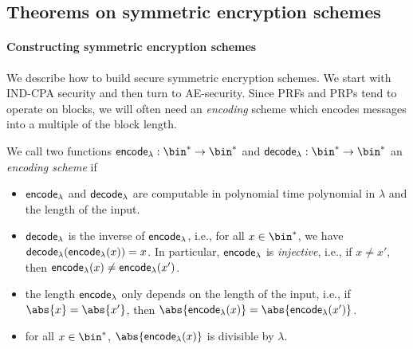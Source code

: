 \subsection{Theorems on symmetric encryption schemes}
\paragraph{Constructing symmetric encryption schemes}
We describe how to build secure symmetric encryption schemes. We start with IND-CPA security
and then turn to AE-security. Since PRFs and PRPs tend to operate on blocks, we will often
need an \emph{encoding} scheme which encodes messages into a multiple of the block length.
\begin{definition}
  We call two functions $\O{encode}_\lambda:\bin^*\rightarrow\bin^*$ and $\O{decode}_\lambda:\bin^*\rightarrow\bin^*$
  an \emph{encoding scheme} if
  \begin{itemize}
    \item $\mathsf{encode}_\lambda$ and $\mathsf{decode}_\lambda$ are computable in polynomial time polynomial in $\lambda$ and the length of the input.
    \item $\mathsf{decode}_\lambda$ is the inverse of $\mathsf{encode}_\lambda$, i.e., for all $x\in\bin^*$, we have
          $\mathsf{decode}_\lambda(\mathsf{encode}_\lambda(x))=x$. In particular, $\mathsf{encode}_\lambda$ is \emph{injective}, i.e., if $x\neq x'$, then $\mathsf{encode}_\lambda(x)\neq\mathsf{encode}_\lambda(x')$.
    \item the length $\mathsf{encode}_\lambda$ only depends on the length of the input, i.e., if $\abs{x}=\abs{x'}$, then
          $\abs{\O{encode}_\lambda(x)}=\abs{\O{encode}_\lambda(x')}$.
    \item for all $x\in\bin^*$, $\abs{\O{encode}_\lambda(x)}$ is divisible by $\lambda$.
  \end{itemize}
\end{definition}

